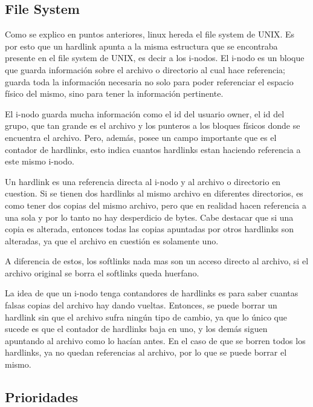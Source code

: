 \documentclass[a4paper, 12pt]{article}
\begin{document}
\subsection*{File System}

Como se explico en puntos anteriores, linux hereda el file system de UNIX. Es por esto que un hardlink apunta a la misma estructura que se encontraba presente en el file system de UNIX, es decir a los i-nodos. El i-nodo es un bloque que guarda informaci\'on sobre el archivo o directorio al cual hace referencia; guarda toda la informaci\'on necesaria no solo para poder referenciar el espacio f\'isico del mismo, sino para tener la informaci\'on pertinente. 

El i-nodo guarda mucha informaci\'on como el id del usuario owner, el id del grupo, que tan grande es el archivo y los punteros a los bloques f\'isicos donde se encuentra el archivo. Pero, adem\'as, posee un campo importante que es el contador de hardlinks, esto indica cuantos hardlinks estan haciendo referencia a este mismo i-nodo. 


Un hardlink es una referencia directa al i-nodo y al archivo o directorio en cuestion. Si se tienen dos hardlinks al mismo archivo en diferentes directorios, es como tener dos copias del mismo archivo, pero que en realidad hacen referencia a una sola y por lo tanto no hay desperdicio de bytes. Cabe destacar que si una copia es alterada, entonces todas las copias apuntadas por otros hardlinks son alteradas, ya que el archivo en cuesti\'on es solamente uno. 

A diferencia de estos, los softlinks nada mas son un acceso directo al archivo, si el archivo original se borra el softlinks queda huerfano.

La idea de que un i-nodo tenga contandores de hardlinks es para saber cuantas falsas copias del archivo hay dando vueltas. Entonces, se puede borrar un hardlink sin que el archivo sufra ning\'un tipo de cambio, ya que lo \'unico que sucede es que el contador de hardlinks baja en uno, y los dem\'as siguen apuntando al archivo como lo hac\'ian antes. En el caso de que se borren todos los hardlinks, ya no quedan referencias al archivo, por lo que se puede borrar el mismo. 


\subsection*{Prioridades}
\end{document}

